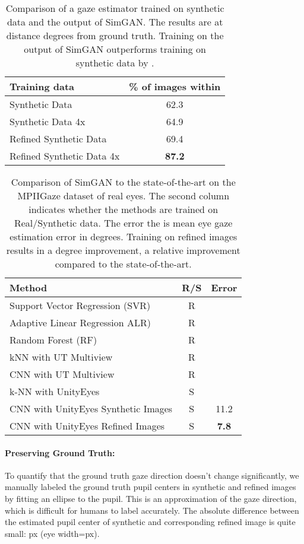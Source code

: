 \documentclass[10pt,twocolumn,letterpaper]{article}
\begin{document}
\begin{table}[]
\centering
\begin{tabular}{|l|c|} \hline
Training data  & \% of images within   \\ \hline 
Synthetic Data & 62.3 \\
Synthetic Data 4x & 64.9 \\
Refined Synthetic Data & 69.4 \\
Refined Synthetic Data 4x & {\bf 87.2} \\
   \hline
\end{tabular}
\caption{Comparison of a gaze estimator trained on synthetic data and the output of SimGAN.
The results are at distance  degrees from ground truth.
Training on the output of SimGAN outperforms training on synthetic data by .
}
\label{tab:results_table_gaze}
\end{table}


\begin{table}[]
\centering
\begin{tabular}{|l|c|c|} \hline
 Method  & R/S & Error   \\ \hline 
  Support Vector Regression (SVR)~\cite{Schneider2014} & R &   \\
  Adaptive Linear Regression ALR)~\cite{Lu2014} & R &  \\
  Random Forest  (RF)~\cite{Sugano2014} & R &  \\
  kNN with UT Multiview~\cite{Zhang15a} & R &  \\
 CNN with UT Multiview~\cite{Zhang15a}& R &  \\ 
  k-NN with UnityEyes~\cite{Wood16}& S &  \\
 CNN with UnityEyes Synthetic Images & S & 11.2 \\ 
 CNN with UnityEyes Refined Images & S & {\bf 7.8} \\ \hline
 
\end{tabular}
\caption{Comparison of SimGAN to the state-of-the-art on the MPIIGaze dataset of real eyes.
The second column indicates whether the methods are trained on Real/Synthetic data.
The error the is mean eye gaze estimation error in degrees.
Training on refined images results in a  degree improvement, a relative  improvement compared to the state-of-the-art.}
\label{tab:MPIIGaze_result}
\end{table}

\paragraph{Preserving Ground Truth:}
To quantify that the ground truth gaze direction doesn't change significantly, we manually labeled the ground truth pupil centers in  synthetic and refined images by fitting an ellipse to the pupil. 
This is an approximation of the gaze direction, which is difficult for humans to label accurately.
The absolute difference between the estimated pupil center of synthetic and corresponding refined image is quite small: px (eye width=px). 
\end{document}
